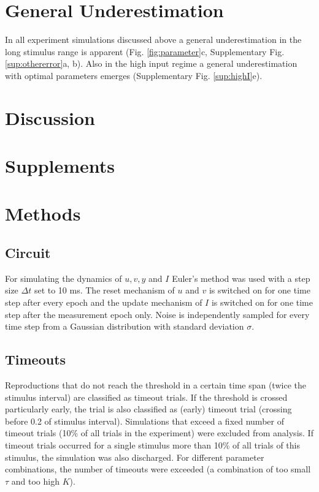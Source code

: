 \documentclass[10pt]{article}
\begin{document}
\section{General Underestimation}
In all experiment simulations discussed above a general underestimation in the long stimulus range is apparent (Fig. \ref{fig:parameter}c, Supplementary Fig. \ref{sup:othererror}a, b).
Also in the high input regime a general underestimation with optimal parameters emerges (Supplementary Fig. \ref{sup:highI}e).


\section{Discussion}

\pagebreak

\setcounter{section}{0}
\section*{Supplements}
\setcounter{figure}{0}
\setcounter{table}{0}
\setcounter{equation}{0} 
\renewcommand{\figurename}{Supplementary Figure}
\renewcommand{\tablename}{Supplementary Table}

\section{Methods}
\subsection*{Circuit}
For simulating the dynamics of $u, v, y$ and $I$ Euler's method was used with a step size $\Delta t$ set to 10 ms.
The reset mechanism of $u$ and $v$ is switched on for one time step after every epoch and the update mechanism of $I$ is switched on for one time step after the measurement epoch only.
Noise is independently sampled for every time step from a Gaussian distribution with standard deviation $\sigma$.

\subsection*{Timeouts}
Reproductions that do not reach the threshold in a certain time span (twice the stimulus interval) are classified as timeout trials. 
If the threshold is crossed particularly early, the trial is also classified as (early) timeout trial (crossing before 0.2 of stimulus interval).
Simulations that exceed a fixed number of timeout trials (10\% of all trials in the experiment) were excluded from analysis.
If timeout trials occurred for a single stimulus more than 10\% of all trials of this stimulus, the simulation was also discharged.
For different parameter combinations, the number of timeouts were exceeded (a combination of too small $\tau$ and too high $K$).
\end{document}
